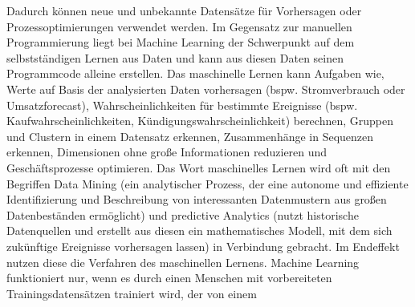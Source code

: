 Dadurch können neue und unbekannte Datensätze für Vorhersagen oder Prozessoptimierungen verwendet werden. Im Gegensatz zur manuellen Programmierung liegt 
bei Machine Learning der Schwerpunkt auf dem selbstständigen Lernen aus Daten und kann aus diesen Daten seinen Programmcode alleine erstellen. 
Das maschinelle Lernen kann Aufgaben wie, Werte auf Basis der analysierten Daten vorhersagen (bspw. Stromverbrauch oder Umsatzforecast), Wahrscheinlichkeiten 
für bestimmte Ereignisse (bspw. Kaufwahrscheinlichkeiten, Kündigungswahrscheinlichkeit) berechnen, Gruppen und Clustern in einem Datensatz erkennen, 
Zusammenhänge in Sequenzen erkennen, Dimensionen ohne große Informationen reduzieren und Geschäftsprozesse optimieren. Das Wort maschinelles Lernen wird oft mit 
den Begriffen Data Mining (ein analytischer Prozess, der eine autonome und effiziente Identifizierung und Beschreibung von interessanten Datenmustern aus großen 
Datenbeständen ermöglicht) und predictive Analytics (nutzt historische Datenquellen und erstellt aus diesen ein mathematisches Modell, mit dem sich zukünftige 
Ereignisse vorhersagen lassen) in Verbindung gebracht. Im Endeffekt nutzen diese die Verfahren des maschinellen Lernens. Machine Learning funktioniert nur,
wenn es durch einen Menschen mit vorbereiteten Trainingsdatensätzen trainiert wird, der von einem
\newline

